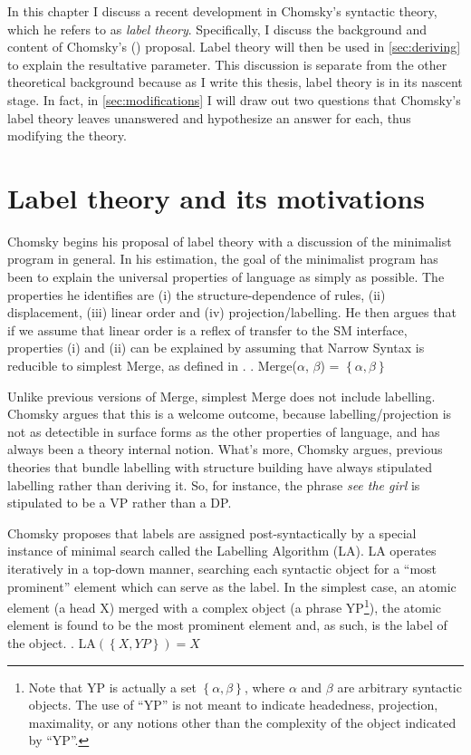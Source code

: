 \documentclass[MilwayThesis]{subfiles}
\begin{document}
In this chapter I discuss a recent development in Chomsky's syntactic theory, which he refers to as \textit{label theory}.
Specifically, I discuss the background and content of Chomsky's (\citeyear{chomsky2013problems,chomsky2015problems}) proposal.
Label theory will then be used in \cref{sec:deriving} to explain the resultative parameter.
This discussion is separate from the other theoretical background because as I write this thesis, label theory is in its nascent stage.
In fact, in \cref{sec:modifications} I will draw out two questions that Chomsky's label theory leaves unanswered and hypothesize an answer for each, thus modifying the theory.
\section{Label theory and its motivations}
Chomsky begins his proposal of label theory with a discussion of the minimalist program in general.
In his estimation, the goal of the minimalist program has been to explain the universal properties of language as simply as possible.
The properties he identifies are (i) the structure-dependence of rules, (ii) displacement, (iii) linear order and (iv) projection/labelling.
He then argues that if we assume that linear order is a reflex of transfer to the SM interface, properties (i) and (ii) can be explained by assuming that Narrow Syntax is reducible to simplest Merge, as defined in \Next.
\ex. Merge($\alpha$, $\beta$) = $\left\{ \alpha, \beta \right\}$

Unlike previous versions of Merge, simplest Merge does not include labelling.
Chomsky argues that this is a welcome outcome, because labelling/projection is not as detectible in surface forms as the other properties of language, and has always been a theory internal notion.
What's more, Chomsky argues, previous theories that bundle labelling with structure building have always stipulated labelling rather than deriving it.
So, for instance, the phrase \textit{see the girl} is stipulated to be a VP rather than a DP.

Chomsky proposes that labels are assigned post-syntactically by a special instance of minimal search called the Labelling Algorithm (LA).
LA operates iteratively in a top-down manner, searching each syntactic object for a ``most prominent'' element which can serve as the label.
In the simplest case, an atomic element (a head X) merged with a complex object (a phrase YP\footnote{
		Note that YP is actually a set $\left\{ \alpha,\beta \right\}$, where $\alpha$ and $\beta$ are arbitrary syntactic objects.
		The use of ``YP'' is not meant to indicate headedness, projection, maximality, or any notions other than the complexity of the object indicated by ``YP''. 
}), the atomic element is found to be the most prominent element and, as such, is the label of the object.
\ex. LA$(\left\{ X, YP \right\}) = X$
\end{document}
